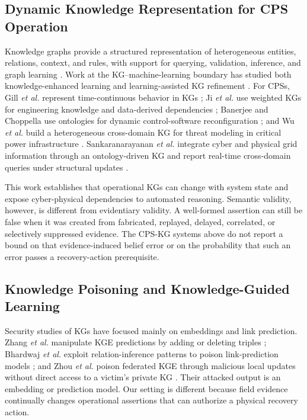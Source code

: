\subsection{Dynamic Knowledge Representation for CPS Operation}
Knowledge graphs provide a structured representation of heterogeneous entities, relations, context, and rules, with support for querying, validation, inference, and graph learning \cite{hogan2021knowledgegraphs}. Work at the KG--machine-learning boundary has studied both knowledge-enhanced learning and learning-assisted KG refinement \cite{damato2023machine}. For CPSs, Gill \emph{et al.} represent time-continuous behavior in KGs \cite{liu2025timecontinuous}; Ji \emph{et al.} use weighted KGs for engineering knowledge and data-derived dependencies \cite{wang2025weightedkg}; Banerjee and Choppella use ontologies for dynamic control-software reconfiguration \cite{knowledge2025dynamic}; and Wu \emph{et al.} build a heterogeneous cross-domain KG for threat modeling in critical power infrastructure \cite{wu2026multidimensional}. Sankaranarayanan \emph{et al.} integrate cyber and physical grid information through an ontology-driven KG and report real-time cross-domain queries under structural updates \cite{sankaranarayanan2026ontology}.

This work establishes that operational KGs can change with system state and expose cyber-physical dependencies to automated reasoning. Semantic validity, however, is different from evidentiary validity. A well-formed assertion can still be false when it was created from fabricated, replayed, delayed, correlated, or selectively suppressed evidence. The CPS-KG systems above do not report a bound on that evidence-induced belief error or on the probability that such an error passes a recovery-action prerequisite.

\subsection{Knowledge Poisoning and Knowledge-Guided Learning}
Security studies of KGs have focused mainly on embeddings and link prediction. Zhang \emph{et al.} manipulate KGE predictions by adding or deleting triples \cite{zhang2019kgpoison}; Bhardwaj \emph{et al.} exploit relation-inference patterns to poison link-prediction models \cite{bhardwaj2021kgpoison}; and Zhou \emph{et al.} poison federated KGE through malicious local updates without direct access to a victim's private KG \cite{zhou2024fkgepoison}. Their attacked output is an embedding or prediction model. Our setting is different because field evidence continually changes operational assertions that can authorize a physical recovery action.

